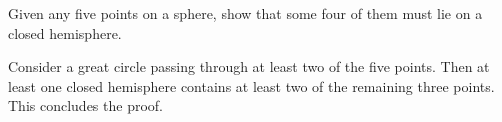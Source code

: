 \documentclass[paper=6.125in:9.25in,twoside,openright,pagesize=pdftex,10pt]{scrbook}
\begin{document}
\begin{problem}
[Putnam 2002]
Given any five points on a sphere, show that some four of them must lie on a closed hemisphere.
\end{problem}

\begin{soln}
Consider a great circle passing through at least two of the five points. Then at least one closed hemisphere contains at least two of the remaining three points. This concludes the proof. 
\end{soln}

\printbibliography
\end{document}
